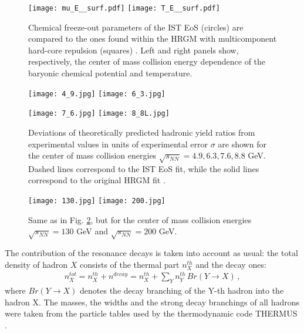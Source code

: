 \documentclass[12pt]{article}
\begin{document}
\begin{figure}[htbp]
  \centerline{\hspace*{7.7mm}
    \texttt{[image: mu\_E\_\_surf.pdf]}
  \hspace*{11mm}
   \texttt{[image: T\_E\_\_surf.pdf]}
  }
 \caption{Chemical freeze-out parameters of 
  the IST EoS  (circles) are compared to the  ones found within 
  the   HRGM with multicomponent hard-core repulsion (squares) \cite{Veta14}. 
Left  and right panels show, respectively,  the center of mass collision energy dependence of  the baryonic chemical potential 
and temperature.
 }
  \label{Fig4}
\end{figure}




\begin{figure}[htbp]
\centerline{
\texttt{[image: 4\_9.jpg]}
  \hspace*{0.22cm}
\texttt{[image: 6\_3.jpg]}
  }
  \vspace*{11mm}
  \centerline{
\texttt{[image: 7\_6.jpg]}
  \hspace*{0.22cm}
\texttt{[image: 8\_8L.jpg]}
  }
 \caption{Deviations of theoretically predicted hadronic yield ratios from experimental values in units of
 experimental error $\sigma$ are shown for the center of mass collision energies $\sqrt{s_{NN}} = 4.9, 6.3, 7.6, 8.8$ GeV. 
 Dashed lines correspond to the IST EoS fit, while the 
 solid lines correspond to the original HRGM  fit \cite{Veta14}. }
\label{Fig5}
\end{figure}
%


\begin{figure}[htbp]
\centerline{
\texttt{[image: 130.jpg]}
  \hspace*{0.22cm}
\texttt{[image: 200.jpg]}
  }
 \caption{ Same as in Fig. \ref{Fig5}, but for the center of mass collision energies
 $\sqrt{s_{NN}} = 130$ GeV and  $\sqrt{s_{NN}} = 200$ GeV. 
 }
\label{Fig6}
\end{figure}
%

The contribution of the resonance decays is  taken into  account   as usual: the total 
density of hadron $X$  consists of the thermal part  $n^{th}_X$  and the decay ones:
%
\begin{eqnarray}\label{EqXXVIII}
%
n^{tot}_X = n^{th}_X+ n^{decay} = n^{th}_X + \sum_{Y} n^{th}_Y \, Br(Y \to X) \,,
\end{eqnarray}
%
where $Br(Y \to X)$ denotes the decay branching of  the Y-th hadron  into the hadron X. The masses, the  widths and the strong decay branchings of all hadrons  were  taken from the particle tables  used  by  the  thermodynamic code THERMUS \cite{THERMUS}.
\end{document}
